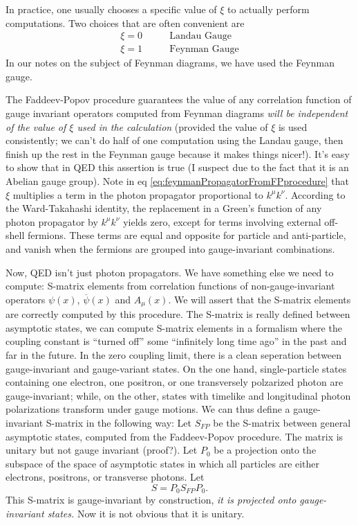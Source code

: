In practice, one usually chooses a specific value of $\xi$ to
actually perform computations. Two choices that are often
convenient are
\begin{align*}
\xi=0&\qquad\text{Landau Gauge}\\
\xi=1&\qquad\text{Feynman Gauge}
\end{align*}
In our notes on the subject of Feynman diagrams, we have used the
Feynman gauge.

The Faddeev-Popov procedure guarantees the value of any
correlation function of gauge invariant operators computed from
Feynman diagrams \emph{will be independent of the value of $\xi$ used
in the calculation} (provided the value of $\xi$ is used
consistently; we can't do half of one computation using the
Landau gauge, then finish up the rest in the Feynman gauge
because it makes things nicer!). It's easy to show that in QED
this assertion is true (I suspect due to the fact that it is an
Abelian gauge group). Note in eq \eqref{eq:feynmanPropagatorFromFPprocedure}
that $\xi$ multiplies a term in the photon propagator
proportional to $k^{\mu}k^{\nu}$. According to the Ward-Takahashi
identity, the replacement in a Green's function of any photon
propagator by $k^{\mu}k^{\nu}$ yields zero, except for terms
involving external off-shell fermions. These terms are equal and
opposite for particle and anti-particle, and vanish when the
fermions are grouped into gauge-invariant combinations.

Now, QED isn't just photon propagators. We have
something else we need to compute: S-matrix elements from
correlation functions of non-gauge-invariant operators $\psi(x)$,
$\overline{\psi}(x)$ and $A_{\mu}(x)$. We will assert that the
S-matrix elements are correctly computed by this procedure. The
S-matrix is really defined between asymptotic states, we can
compute S-matrix elements in a formalism where the coupling
constant is ``turned off'' some ``infinitely long time ago'' in
the past and far in the future. In the zero coupling limit, there
is a clean seperation between gauge-invariant and gauge-variant
states. On the one hand, single-particle states containing one
electron, one positron, or one transversely polzarized photon are
gauge-invariant; while, on the other, states with timelike and
longitudinal photon polarizations transform under gauge
motions. We can thus define a gauge-invariant S-matrix in the
following way: Let $S_{FP}$ be the S-matrix between general
asymptotic states, computed from the Faddeev-Popov procedure. The
matrix is unitary but not gauge invariant (proof?). Let $P_{0}$
be a projection onto the subspace of the space of asymptotic
states in which all particles are either electrons, positrons, or
transverse photons. Let
\begin{equation}\label{eq:SMatrixOnGaugeInvariantStates}
S = P_{0} S_{FP} P_{0}.
\end{equation}
This S-matrix is gauge-invariant by construction, \emph{it is projected
onto gauge-invariant states.} Now it is not obvious that it is
unitary. 

